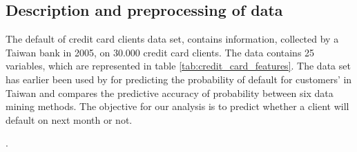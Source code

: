 \subsection{Description and preprocessing of data}
The default of credit card clients data set, contains information, collected by a Taiwan bank in 2005, on $30.000$ credit card clients. The data contains 25 variables, which are represented in table \ref{tab:credit_card_features}. The data set has earlier been used by \cite{Yeh2009TheCO} for predicting the probability of default for customers' in Taiwan and compares the predictive accuracy of probability between six data mining methods. The objective for our analysis is to predict whether a client will default on next month or not. 


\begin{table}
\caption{Table of features in credit card default data. Data contains 30.000 examples each with 25 features. Data can be downloaded on \href{https://archive.ics.uci.edu/ml/datasets.php}{https://archive.ics.uci.edu/ml/datasets.php}}.
\end{table}

